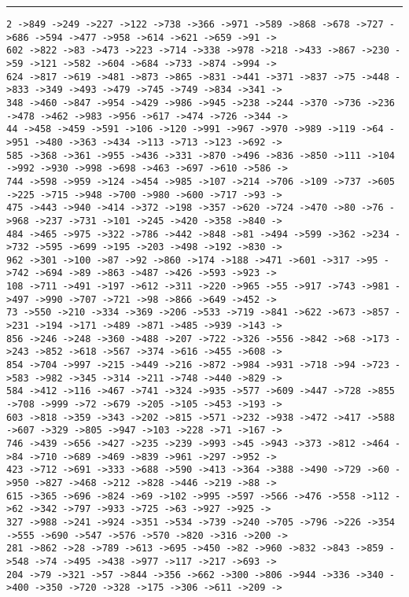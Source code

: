 \documentclass[letter, 12pt]{article}
\newenvironment{question}[1]{%
    \vspace{.2in}%
        \noindent{\bf #1}%
    \vspace{0.3em} \hrule \vspace{.1in}%
}{}
\begin{document}
\begin{question}{\large Appendix}
\begin{lstlisting}[style=CStyle]
2 ->849 ->249 ->227 ->122 ->738 ->366 ->971 ->589 ->868 ->678 ->727 ->686 ->594 ->477 ->958 ->614 ->621 ->659 ->91 ->
602 ->822 ->83 ->473 ->223 ->714 ->338 ->978 ->218 ->433 ->867 ->230 ->59 ->121 ->582 ->604 ->684 ->733 ->874 ->994 ->
624 ->817 ->619 ->481 ->873 ->865 ->831 ->441 ->371 ->837 ->75 ->448 ->833 ->349 ->493 ->479 ->745 ->749 ->834 ->341 ->
348 ->460 ->847 ->954 ->429 ->986 ->945 ->238 ->244 ->370 ->736 ->236 ->478 ->462 ->983 ->956 ->617 ->474 ->726 ->344 ->
44 ->458 ->459 ->591 ->106 ->120 ->991 ->967 ->970 ->989 ->119 ->64 ->951 ->480 ->363 ->434 ->113 ->713 ->123 ->692 ->
585 ->368 ->361 ->955 ->436 ->331 ->870 ->496 ->836 ->850 ->111 ->104 ->992 ->930 ->998 ->698 ->463 ->697 ->610 ->586 ->
744 ->598 ->959 ->124 ->454 ->985 ->107 ->214 ->706 ->109 ->737 ->605 ->225 ->715 ->948 ->700 ->980 ->600 ->717 ->93 ->
475 ->443 ->940 ->414 ->372 ->198 ->357 ->620 ->724 ->470 ->80 ->76 ->968 ->237 ->731 ->101 ->245 ->420 ->358 ->840 ->
484 ->465 ->975 ->322 ->786 ->442 ->848 ->81 ->494 ->599 ->362 ->234 ->732 ->595 ->699 ->195 ->203 ->498 ->192 ->830 ->
962 ->301 ->100 ->87 ->92 ->860 ->174 ->188 ->471 ->601 ->317 ->95 ->742 ->694 ->89 ->863 ->487 ->426 ->593 ->923 ->
108 ->711 ->491 ->197 ->612 ->311 ->220 ->965 ->55 ->917 ->743 ->981 ->497 ->990 ->707 ->721 ->98 ->866 ->649 ->452 ->
73 ->550 ->210 ->334 ->369 ->206 ->533 ->719 ->841 ->622 ->673 ->857 ->231 ->194 ->171 ->489 ->871 ->485 ->939 ->143 ->
856 ->246 ->248 ->360 ->488 ->207 ->722 ->326 ->556 ->842 ->68 ->173 ->243 ->852 ->618 ->567 ->374 ->616 ->455 ->608 ->
854 ->704 ->997 ->215 ->449 ->216 ->872 ->984 ->931 ->718 ->94 ->723 ->583 ->982 ->345 ->314 ->211 ->748 ->440 ->829 ->
584 ->412 ->116 ->467 ->741 ->324 ->935 ->577 ->609 ->447 ->728 ->855 ->708 ->999 ->72 ->679 ->205 ->105 ->453 ->193 ->
603 ->818 ->359 ->343 ->202 ->815 ->571 ->232 ->938 ->472 ->417 ->588 ->607 ->329 ->805 ->947 ->103 ->228 ->71 ->167 ->
746 ->439 ->656 ->427 ->235 ->239 ->993 ->45 ->943 ->373 ->812 ->464 ->84 ->710 ->689 ->469 ->839 ->961 ->297 ->952 ->
423 ->712 ->691 ->333 ->688 ->590 ->413 ->364 ->388 ->490 ->729 ->60 ->950 ->827 ->468 ->212 ->828 ->446 ->219 ->88 ->
615 ->365 ->696 ->824 ->69 ->102 ->995 ->597 ->566 ->476 ->558 ->112 ->62 ->342 ->797 ->933 ->725 ->63 ->927 ->925 ->
327 ->988 ->241 ->924 ->351 ->534 ->739 ->240 ->705 ->796 ->226 ->354 ->555 ->690 ->547 ->576 ->570 ->820 ->316 ->200 ->
281 ->862 ->28 ->789 ->613 ->695 ->450 ->82 ->960 ->832 ->843 ->859 ->548 ->74 ->495 ->438 ->977 ->117 ->217 ->693 ->
204 ->79 ->321 ->57 ->844 ->356 ->662 ->300 ->806 ->944 ->336 ->340 ->400 ->350 ->720 ->328 ->175 ->306 ->611 ->209 ->

\end{lstlisting}
\end{question}
\end{document}
